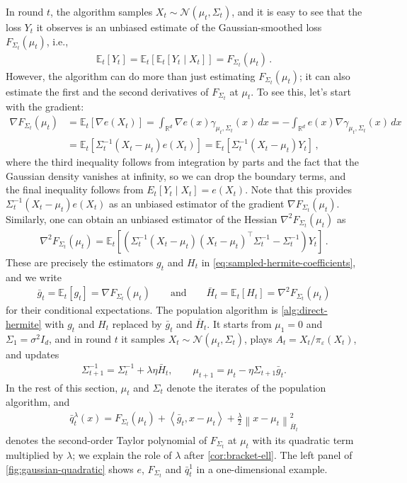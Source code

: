 \documentclass[12pt,cleveref]{jmlr}
\newcommand{\R}{\mathbb R}
\newcommand{\E}{\mathbb E}
\newcommand{\N}{\mathcal N}
\newcommand{\1}{\mathbf 1}
\newcommand{\eps}{\varepsilon}
\newcommand{\ip}[2]{\left\langle #1,#2\right\rangle}
\newcommand{\normm}[2]{\left\lVert #1\right\rVert_{#2}}
\begin{document}
In round $t$, the algorithm samples $X_t \sim \N(\mu_t, \Sigma_t)$, and it is easy to see that the loss $Y_t$ it observes
is an unbiased estimate of the Gaussian-smoothed loss $F_{\Sigma_t}(\mu_t)$, i.e.,
\begin{align}
    \E_t[Y_t] = \E_t[\E_t[Y_t\mid X_t]] = F_{\Sigma_t}(\mu_t)\,.
\end{align}
However, the algorithm can do more than just estimating $F_{\Sigma_t}(\mu_t)$; it can also estimate
the first and the second derivatives of $F_{\Sigma_t}$ at $\mu_t$.
To see this, let's start with the gradient:
\begin{align}
    \nabla F_{\Sigma_t}(\mu_t) & = \E_t[\nabla e(X_t)] = \int_{\R^d} \nabla e(x) \gamma_{\mu_t,\Sigma_t}(x) \, dx
    = -\int_{\R^d} e(x) \nabla \gamma_{\mu_t, \Sigma_t}(x) \, dx                                                  \\
    & = \E_t\!\left[\Sigma_t^{-1}(X_t-\mu_t)e(X_t)\right]
    = \E_t\!\left[\Sigma_t^{-1}(X_t-\mu_t)Y_t\right]
    \,,
\end{align}
where the third inequality follows from integration by parts and the fact that the Gaussian density vanishes at infinity, so we can drop
the boundary terms, and the final inequality follows from $E_t[Y_t\mid X_t] = e(X_t)$.
Note that this provides $\Sigma_t^{-1}(X_t-\mu_t)e(X_t)$ as an unbiased estimator of the gradient $\nabla F_{\Sigma_t}(\mu_t)$.
Similarly, one can obtain an unbiased estimator of the Hessian $\nabla^2 F_{\Sigma_t}(\mu_t)$ as
\begin{align}
    \nabla^2 F_{\Sigma_t}(\mu_t) = \E_t\!\left[\left(\Sigma_t^{-1}(X_t-\mu_t)(X_t-\mu_t)^\top \Sigma_t^{-1} - \Sigma_t^{-1}\right) Y_t\right]\,.
\end{align}
These are precisely the estimators $g_t$ and $H_t$ in \cref{eq:sampled-hermite-coefficients}, and we write
\begin{align}
    \bar g_t=\E_t[g_t]=\nabla F_{\Sigma_t}(\mu_t)
    \qquad\text{and}\qquad
    \bar H_t=\E_t[H_t]=\nabla^2F_{\Sigma_t}(\mu_t)
\end{align}
for their conditional expectations.
The population algorithm is \cref{alg:direct-hermite} with $g_t$ and $H_t$ replaced by $\bar g_t$ and $\bar H_t$.
It starts from $\mu_1=0$ and $\Sigma_1=\sigma^2I_d$, and in round $t$ it samples $X_t\sim\N(\mu_t,\Sigma_t)$, plays $A_t=X_t/\pi_\eps(X_t)$, and updates
\begin{align}
    \Sigma_{t+1}^{-1}=\Sigma_t^{-1}+\lambda\eta\bar H_t,
    \qquad
    \mu_{t+1}=\mu_t-\eta\Sigma_{t+1}\bar g_t.
\end{align}
In the rest of this section, $\mu_t$ and $\Sigma_t$ denote the iterates of the population algorithm, and
\begin{align}
    \bar q_t^\lambda(x)
    =F_{\Sigma_t}(\mu_t)+\ip{\bar g_t}{x-\mu_t}+\frac\lambda2\normm{x-\mu_t}{\bar H_t}^2
\end{align}
denotes the second-order Taylor polynomial of $F_{\Sigma_t}$ at $\mu_t$ with its quadratic term multiplied by $\lambda$; we explain the role of $\lambda$ after \cref{cor:bracket-ell}.
The left panel of \cref{fig:gaussian-quadratic} shows $e$, $F_{\Sigma_t}$ and $\bar q_t^1$ in a one-dimensional example.
\end{document}
